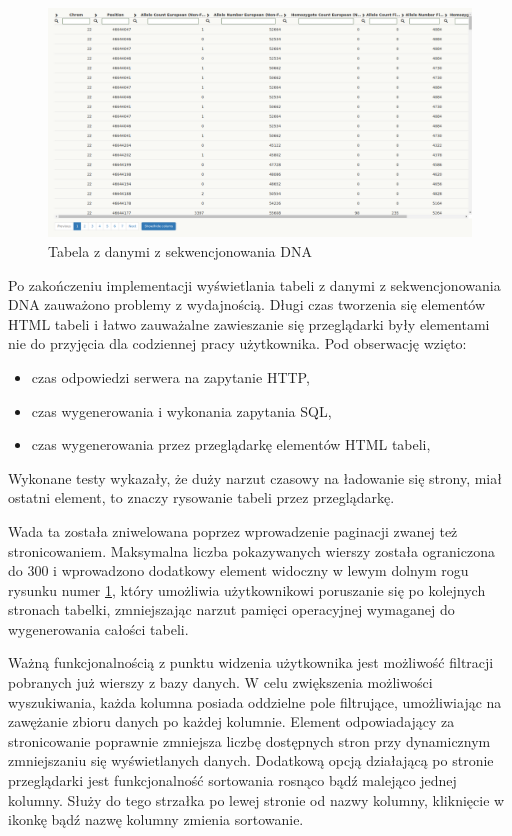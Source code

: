 \documentclass[a4paper,12pt,twoside]{article}
\begin{document}
\begin{figure}[h!]
\includegraphics[width=\linewidth]{obrazy/aplikacja/table1.png}
\caption{Tabela z danymi z sekwencjonowania DNA}
\label{fig:table1pic}
\end{figure}

Po zakończeniu implementacji wyświetlania tabeli z danymi z sekwencjonowania DNA zauważono problemy z wydajnością.
Długi czas tworzenia się elementów HTML tabeli i łatwo zauważalne zawieszanie się przeglądarki
były elementami nie do przyjęcia dla codziennej pracy użytkownika.
Pod obserwację wzięto:
\begin{itemize}
\item czas odpowiedzi serwera na zapytanie HTTP,
\item czas wygenerowania i wykonania zapytania SQL,
\item czas wygenerowania przez przeglądarkę elementów HTML tabeli,
\end{itemize}
Wykonane testy wykazały, że duży narzut czasowy na ładowanie się strony, miał ostatni
element, to znaczy rysowanie tabeli przez przeglądarkę.

Wada ta została zniwelowana poprzez wprowadzenie paginacji zwanej też stronicowaniem.
Maksymalna liczba pokazywanych wierszy została ograniczona do 300 i wprowadzono dodatkowy
element widoczny w lewym dolnym rogu rysunku numer \ref{fig:table1pic}, który umożliwia
użytkownikowi poruszanie się po kolejnych stronach tabelki, zmniejszając narzut
pamięci operacyjnej wymaganej do wygenerowania całości tabeli.
\newline

Ważną funkcjonalnością z punktu widzenia użytkownika jest możliwość filtracji pobranych już wierszy
z bazy danych. W celu zwiększenia możliwości wyszukiwania, każda kolumna posiada oddzielne pole
filtrujące, umożliwiając na zawężanie zbioru danych po każdej kolumnie. Element odpowiadający
za stronicowanie poprawnie zmniejsza liczbę dostępnych stron przy dynamicznym zmniejszaniu się
wyświetlanych danych.
Dodatkową opcją działającą po stronie przeglądarki jest
funkcjonalność sortowania rosnąco bądź malejąco jednej kolumny. Służy do tego strzałka po
lewej stronie od nazwy kolumny, kliknięcie w ikonkę bądź nazwę kolumny zmienia sortowanie.
\end{document}
